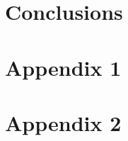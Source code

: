 \documentclass[twoside,openright,titlepage,numbers=noenddot,headinclude,footinclude=true,cleardoublepage=empty,listof=totoc,paper=a4,fontsize=11pt,australian,twoside=semi,DIV=calc]{scrreprt}
\begin{document}
  \chapter{Conclusions}\label{c:Conclusions}
  
  
  \cleardoublepage

  \appendix
 \chapter{Appendix 1}\label{app:A}
  \acresetall 
  
  \acresetall 
  \chapter{Appendix 2}\label{app:B}
  

  
  \singlespacing
  
  \cleardoublepage
  
  \pagestyle{empty}
  \onehalfspacing
  
\end{document}
